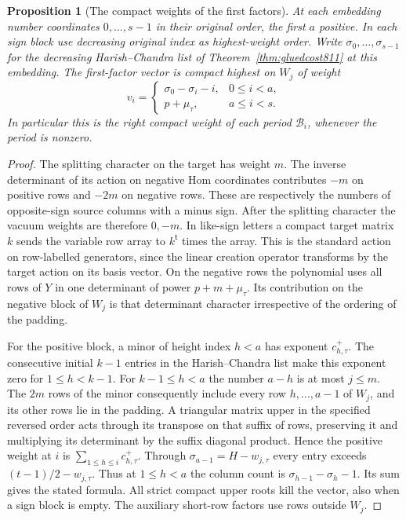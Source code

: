 \documentclass[a4paper,11pt]{article}
\newtheorem{proposition}{Proposition}[section]
\theoremstyle{definition}
\theoremstyle{remark}
\numberwithin{equation}{section}
\begin{document}
\begin{proposition}[The compact weights of the first factors]
\leavevmode\label{prop:firstcompact817}
At each embedding number coordinates \(0,\ldots,s-1\) in their
original order, the first \(a\) positive. In each sign block
use decreasing original index as highest-weight order.
Write \(\sigma_0,\ldots,\sigma_{s-1}\) for the decreasing
Harish--Chandra list of Theorem~\ref{thm:gluedcost811}
at this embedding. The first-factor vector is compact
highest on \(W_j\) of weight
\[
  v_i=
  \begin{cases}
   \sigma_0-\sigma_i-i,&0\le i<a,\\
   p+\mu_\tau,&a\le i<s .
  \end{cases}
\]
In particular this is the right compact weight of each
period \(\mathcal B_i\), whenever the period is nonzero.
\end{proposition}
\begin{proof}
The splitting character on the target has weight \(m\).
The inverse determinant of its action on negative Hom
coordinates contributes \(-m\) on positive rows and
\(-2m\) on negative rows. These are respectively the
numbers of opposite-sign source columns with a minus sign.
After the splitting character the vacuum weights are
therefore \(0,-m\). In like-sign letters a compact target
matrix \(k\) sends the variable row array to \(k^{\mathsf t}\)
times the array. This is the standard action on row-labelled
generators, since the linear creation operator transforms by
the target action on its basis vector. On the negative
rows the polynomial uses all rows of \(Y\) in one determinant
of power \(p+m+\mu_\tau\). Its contribution on the negative
block of \(W_j\) is that determinant character irrespective
of the ordering of the padding.

For the positive block, a minor of height index \(h<a\)
has exponent \(c^+_{h,\tau}\). The consecutive initial
\(k-1\) entries in the Harish--Chandra list make this
exponent zero for \(1\le h<k-1\). For \(k-1\le h<a\) the
number \(a-h\) is at most \(j\le m\). The \(2m\) rows
of the minor consequently include every row \(h,\ldots,a-1\)
of \(W_j\), and its other rows lie in the padding. A
triangular matrix upper in the specified reversed order
acts through its transpose on that suffix of rows, preserving
it and multiplying its determinant by the suffix diagonal
product. Hence the positive weight at \(i\) is
\(\sum_{1\le h\le i}c^+_{h,\tau}\).
Through \(\sigma_{a-1}=H-w_{j,\tau}\) every entry exceeds
\((t-1)/2-w_{j,\tau}\). Thus at \(1\le h<a\) the column
count is \(\sigma_{h-1}-\sigma_h-1\). Its sum gives
the stated formula. All strict compact upper roots kill
the vector, also when a sign block is empty. The auxiliary
short-row factors use rows outside \(W_j\).
\end{proof}
\end{document}
